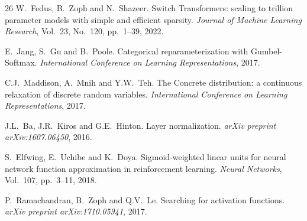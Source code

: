 \documentclass{WCCM-ECCOMAS_2026_Full_Paper}
\begin{document}
\begin{thebibliography}{26}
W.~Fedus, B.~Zoph and N.~Shazeer.
Switch Transformers: scaling to trillion parameter models with
simple and efficient sparsity.
\textit{Journal of Machine Learning Research}, Vol.~23, No.~120,
pp.~1--39, 2022.

E.~Jang, S.~Gu and B.~Poole.
Categorical reparameterization with Gumbel-Softmax.
\textit{International Conference on Learning Representations}, 2017.

C.J.~Maddison, A.~Mnih and Y.W.~Teh.
The Concrete distribution: a continuous relaxation of discrete
random variables.
\textit{International Conference on Learning Representations}, 2017.

J.L.~Ba, J.R.~Kiros and G.E.~Hinton.
Layer normalization.
\textit{arXiv preprint arXiv:1607.06450}, 2016.

S.~Elfwing, E.~Uchibe and K.~Doya.
Sigmoid-weighted linear units for neural network function
approximation in reinforcement learning.
\textit{Neural Networks}, Vol.~107, pp.~3--11, 2018.

P.~Ramachandran, B.~Zoph and Q.V.~Le.
Searching for activation functions.
\textit{arXiv preprint arXiv:1710.05941}, 2017.

\end{thebibliography}
\end{document}
